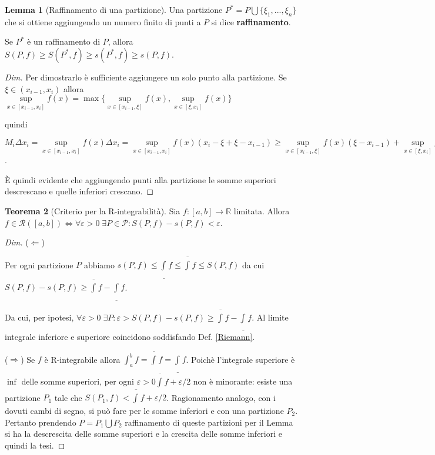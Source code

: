 \documentclass{article}
\theoremstyle{definition}
\newtheorem{theorem}{Teorema}[section]
\theoremstyle{definition}
\newtheorem{lemma}[theorem]{Lemma}
\theoremstyle{definition}
\theoremstyle{definition}
\theoremstyle{definition}
\begin{document}
\begin{lemma}[Raffinamento di una partizione]
    Una partizione $P^*=P \bigcup \lbrace\xi_1,...,\xi_n \rbrace$ che si ottiene aggiungendo un numero finito di punti a $P$ si dice \textbf{raffinamento}.
    
    Se $P^*$ è un raffinamento di $P$, allora $S(P,f) \geq S(P^*,f) \geq s(P^*,f) \geq s(P,f)$.
    \begin{proof}[Dim]
        Per dimostrarlo è sufficiente aggiungere un solo punto alla partizione. Se $\xi \in (x_{i-1},x_i)$ allora $\underset{x \in [x_{i-1},x_i]}{\sup} f(x) = \max \lbrace \underset{x \in [x_{i-1},\xi]}{\sup} f(x), \underset{x \in [\xi,x_i]}{\sup} f(x) \rbrace$

        \vspace{3mm}

        quindi

        \vspace{2mm}

        $M_i \Delta x_i = \underset{x \in [x_{i-1},x_i]}{\sup} f(x) \Delta x_i = \underset{x \in [x_{i-1},x_i]}{\sup} f(x)(x_i -\xi + \xi - x_{i-1}) \geq \underset{x \in [x_{i-1},\xi]}{\sup} f(x)(\xi-x_{i-1}) + \underset{x \in [\xi,x_i]}{\sup} f(x)(x_i- \xi)$.

        È quindi evidente che aggiungendo punti alla partizione le somme superiori descrescano e quelle inferiori crescano.
    \end{proof}
\end{lemma}

\begin{theorem}[Criterio per la R-integrabilità]
    Sia $f:[a,b]\rightarrow \mathbb{R}$ limitata. Allora $f\in\mathcal{R}([a,b]) \Leftrightarrow \forall\varepsilon >0 \; \exists P\in\mathcal{P}: S(P,f)-s(P,f)<\varepsilon$.
    \begin{proof}[Dim]

        ($\Leftarrow$)

        Per ogni partizione $P$ abbiamo $s(P,f) \leq \underline{\int_{}^{}}f \leq \overline{\int_{}^{}}f \leq S(P,f)$ da cui $S(P,f)-s(P,f) \geq \overline{\int_{}^{}}f-\underline{\int_{}^{}}f$.

        Da cui, per ipotesi,
        $\forall \varepsilon > 0 \; \exists P: \varepsilon > S(P,f) - s(P,f) \geq \overline{\int_{}^{}}f-\underline{\int_{}^{}}f$. Al limite integrale inferiore e superiore coincidono soddisfando Def. \ref{Riemann}.

        ($\Rightarrow$) Se $f$ è R-integrabile allora $\int_{a}^{b}f = \overline{\int_{}^{}} f = \underline{\int_{}^{}} f$. Poichè l'integrale superiore è $\inf$ delle somme superiori, per ogni $\varepsilon > 0 \overline{\int_{}^{}}f+ \varepsilon/2$ non è minorante: esiste una partizione $P_1$ tale che $S(P_1,f)<\overline{\int_{}^{}}f+ \varepsilon/2$. Ragionamento analogo, con i dovuti cambi di segno, si può fare per le somme inferiori e con una partizione $P_2$. Pertanto prendendo $P = P_1 \bigcup P_2$ raffinamento di queste partizioni per il Lemma si ha la descrescita delle somme superiori e la crescita delle somme inferiori e quindi la tesi.
    \end{proof}
\end{theorem}
\end{document}
